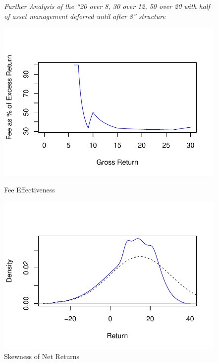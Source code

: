 \documentclass[12pt,english]{article}\usepackage[]{graphicx}\usepackage[]{color}
\makeatletter
\def\maxwidth{ %
  \ifdim\Gin@nat@width>\linewidth
    \linewidth
  \else
    \Gin@nat@width
  \fi
}
\newenvironment{knitrout}{}{} %
\makeatother
\begin{document}
\begin{figure}
\emph{Further Analysis of the ``20 over 8, 30 over 12, 50 over 20
with half of asset management deferred until after 8'' structure}

\begin{minipage}[t]{0.45\columnwidth}%


\begin{knitrout}
\color{fgcolor}
\includegraphics[width=\maxwidth]{figure/ce3-1} 

\end{knitrout}

\caption{Fee Effectiveness}
%
\end{minipage}\hfill{}%
\begin{minipage}[t]{0.45\columnwidth}%
\begin{knitrout}
\color{fgcolor}
\includegraphics[width=\maxwidth]{figure/skew2-1} 

\end{knitrout}

\caption{Skewness of Net Returns}
%
\end{minipage}
\end{figure}
\end{document}
